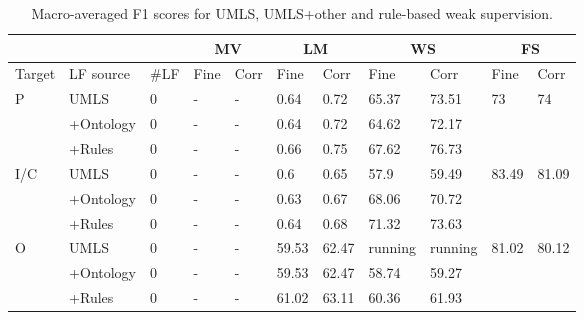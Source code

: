 \documentclass[10.7pt,]{article}
\begin{document}
\begin{table}[!ht]
    \centering
    \begin{tabular}{|l|l|l|l|l|l|l|l|l|l|l|}
        \hline
        \multicolumn{3}{|c|}{} &
        \multicolumn{2}{|c|}{MV} & \multicolumn{2}{|c|}{LM} & \multicolumn{2}{|c|}{WS} & \multicolumn{2}{|c|}{FS} \\
        \hline
        Target & LF source & \#LF & Fine & Corr & Fine & Corr & Fine & Corr & Fine & Corr \\
        \hline
        P & UMLS & 0 & - & - & 0.64 & 0.72 & 65.37 & 73.51 & 73 & 74 \\ 
        ~ & +Ontology & 0 & - & - & 0.64 & 0.72 & 64.62 & 72.17 & ~ & ~ \\ 
        ~ & +Rules & 0 & - & - & 0.66 & 0.75 & 67.62 & 76.73 & ~ & ~ \\ 
        I/C & UMLS & 0 & - & - & 0.6 & 0.65 & 57.9 & 59.49 & 83.49 & 81.09 \\ 
        ~ & +Ontology & 0 & - & - & 0.63 & 0.67 & 68.06 & 70.72 & ~ & ~ \\ 
        ~ & +Rules & 0 & - & - & 0.64 & 0.68 & 71.32 & 73.63 & ~ & ~ \\ 
        O & UMLS & 0 & - & - & 59.53 & 62.47 & running & running & 81.02 & 80.12 \\ 
        ~ & +Ontology & 0 & - & - & 59.53 & 62.47 & 58.74 & 59.27 & ~ & ~ \\ 
        ~ & +Rules & 0 & - & - & 61.02 & 63.11 & 60.36 & 61.93 & ~ & ~ \\ \hline
    \end{tabular}
    \caption{\label{tab:res} Macro-averaged F1 scores for UMLS, UMLS+other and rule-based weak supervision.}
\end{table}
\end{document}
